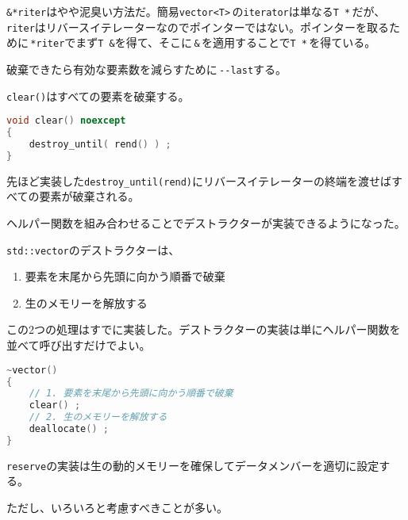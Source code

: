 \texttt{\&*riter}はやや泥臭い方法だ。簡易\texttt{vector<T>}\,の\texttt{iterator}は単なる\texttt{T *}\,だが、\texttt{riter}はリバースイテレーターなのでポインターではない。ポインターを取るために\,\texttt{*riter}でまず\texttt{T \&}を得て、そこに\,\texttt{\&}\,を適用することで\texttt{T *}\,を得ている。

破棄できたら有効な要素数を減らすために\,\texttt{{-}{-}last}する。

\clearpage
{}

\texttt{clear()}はすべての要素を破棄する。

\begin{lstlisting}[language={C++}]
void clear() noexcept
{
    destroy_until( rend() ) ;
}
\end{lstlisting}

先ほど実装した\texttt{destroy\_until(rend)}にリバースイテレーターの終端を渡せばすべての要素が破棄される。


ヘルパー関数を組み合わせることでデストラクターが実装できるようになった。

\texttt{std::vector}のデストラクターは、

\begin{enumerate}
\def\labelenumi{\arabic{enumi}.}
\item
  要素を末尾から先頭に向かう順番で破棄
\item
  生のメモリーを解放する
\end{enumerate}

この2つの処理はすでに実装した。デストラクターの実装は単にヘルパー関数を並べて呼び出すだけでよい。

\begin{lstlisting}[language={C++}]
~vector()
{
    // 1. 要素を末尾から先頭に向かう順番で破棄
    clear() ;
    // 2. 生のメモリーを解放する
    deallocate() ;    
}         
\end{lstlisting}


\texttt{reserve}の実装は生の動的メモリーを確保してデータメンバーを適切に設定する。

ただし、いろいろと考慮すべきことが多い。

